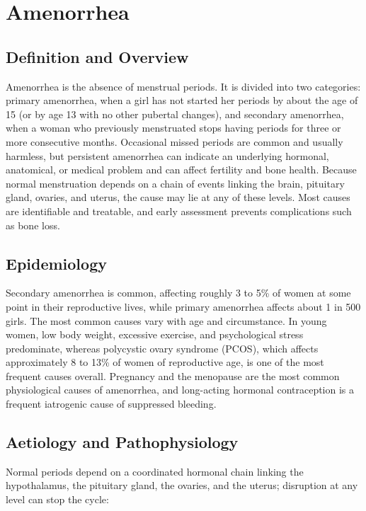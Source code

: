 \chapter{Amenorrhea}

\section*{Definition and Overview}
Amenorrhea is the absence of menstrual periods. It is divided into two categories: primary amenorrhea, when a girl has not started her periods by about the age of 15 (or by age 13 with no other pubertal changes), and secondary amenorrhea, when a woman who previously menstruated stops having periods for three or more consecutive months. Occasional missed periods are common and usually harmless, but persistent amenorrhea can indicate an underlying hormonal, anatomical, or medical problem and can affect fertility and bone health. Because normal menstruation depends on a chain of events linking the brain, pituitary gland, ovaries, and uterus, the cause may lie at any of these levels. Most causes are identifiable and treatable, and early assessment prevents complications such as bone loss.

\section*{Epidemiology}
Secondary amenorrhea is common, affecting roughly 3 to 5\% of women at some point in their reproductive lives, while primary amenorrhea affects about 1 in 500 girls. The most common causes vary with age and circumstance. In young women, low body weight, excessive exercise, and psychological stress predominate, whereas polycystic ovary syndrome (PCOS), which affects approximately 8 to 13\% of women of reproductive age, is one of the most frequent causes overall. Pregnancy and the menopause are the most common physiological causes of amenorrhea, and long-acting hormonal contraception is a frequent iatrogenic cause of suppressed bleeding.

\section*{Aetiology and Pathophysiology}
Normal periods depend on a coordinated hormonal chain linking the hypothalamus, the pituitary gland, the ovaries, and the uterus; disruption at any level can stop the cycle:


